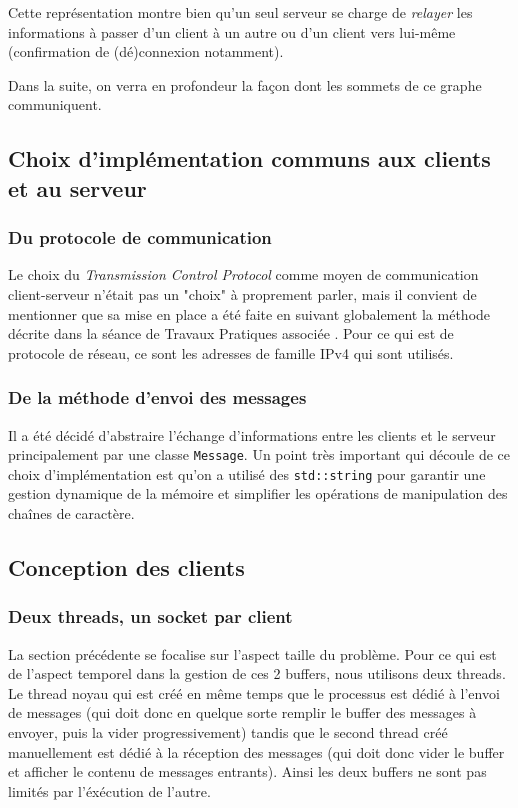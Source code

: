 \documentclass{article}
\begin{document}
\noindent Cette représentation montre bien qu'un seul serveur se charge de \textit{relayer} les informations à passer d'un client à un autre ou d'un client vers lui-même (confirmation de (dé)connexion notamment).

\noindent Dans la suite, on verra en profondeur la façon dont les sommets de ce graphe communiquent.

\subsection{Choix d'implémentation communs aux clients et au serveur}

\subsubsection{Du protocole de communication}
Le choix du \textit{Transmission Control Protocol} \cite{TCP-IP} comme moyen de communication client-serveur n'était pas un "choix" à proprement parler, mais il convient de mentionner que sa mise en place a été faite en suivant globalement la méthode décrite dans la séance de Travaux Pratiques associée \cite{TP_OS}. Pour ce qui est de protocole de réseau, ce sont les adresses de famille IPv4 qui sont utilisés.

\subsubsection{De la méthode d'envoi des messages}
\noindent Il a été décidé d'abstraire l'échange d'informations entre les clients et le serveur principalement par une classe \texttt{Message}. Un point très important qui découle de ce choix d'implémentation est qu'on a utilisé des \texttt{std::string} \cite{std::string} pour garantir une gestion dynamique de la mémoire et simplifier les opérations de manipulation des chaînes de caractère.

\subsection{Conception des clients}

\subsubsection{Deux threads, un socket par client}
 La section précédente se focalise sur l'aspect taille du problème. Pour ce qui est de l'aspect temporel dans la gestion de ces 2 buffers, nous utilisons deux threads. Le thread noyau qui est créé en même temps que le processus est dédié à l'envoi de messages (qui doit donc en quelque sorte remplir le buffer des messages à envoyer, puis la vider progressivement) tandis que le second thread créé manuellement est dédié à la réception des messages (qui doit donc vider le buffer et afficher le contenu de messages entrants). Ainsi les deux buffers ne sont pas limités par l'éxécution de l'autre.
\end{document}
